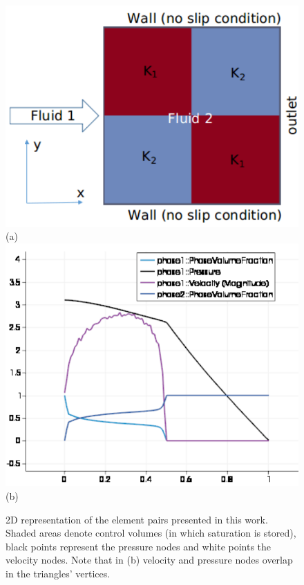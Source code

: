 \documentclass[preprint,authoryear,12pt]{elsarticle}
\begin{document}
\begin{figure}[h]
\centering
\vbox{\includegraphics[width=.75\textwidth]{./Pics/2b2_P1DGP2.pdf}
      \vspace{1.0cm} (a)
      \includegraphics[width=.75\textwidth]{./Pics/2b2_P1DGP2_plot.pdf}
      \vspace{0.0cm} (b)
}     
\caption{2D representation of the element pairs presented in this work. Shaded areas denote control volumes (in which saturation is stored), black points represent the pressure nodes and white points the velocity nodes. Note that in (b) velocity and pressure nodes overlap in the triangles' vertices.}
\label{fem_cv_represent_a}
\end{figure}
\end{document}
